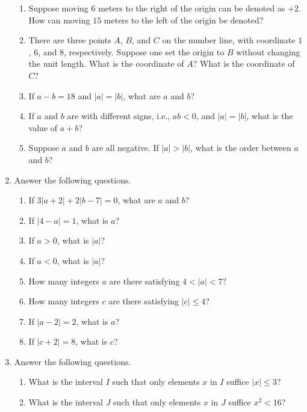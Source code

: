 \documentclass[11pt]{book}
\begin{document}
\begin{enumerate}[label=\arabic*.]
\begin{enumerate}
        \item Suppose moving $6$ meters to the right of the origin can be denoted as $+2$. How can moving $15$ meters to the left of the origin be denoted?
        \item There are three points $A$, $B$, and $C$ on the number line, with coordinate $1$, $6$, and $8$, respectively. Suppose one set the origin to $B$ without changing the unit length. What is the coordinate of $A$? What is the coordinate of $C$?
        \item If $a-b=18$ and $|a|=|b|$, what are $a$ and $b$?
        \item If $a$ and $b$ are with different signs, i.e., $ab<0$, and $|a|=|b|$, what is the value of $a+b$?
        \item Suppose $a$ and $b$ are all negative. If $|a|>|b|$, what is the order between $a$ and $b$?
    \end{enumerate}
    \item Answer the following questions.
    \begin{enumerate}
        \item If $3|a+2|+2|b-7|=0$, what are $a$ and $b$?
        \item If $|4-a|=1$, what is $a$?
        \item If $a>0$, what is $|a|$?
        \item If $a<0$, what is $|a|$?
        \item How many integers $a$ are there satisfying $4<|a|<7$?
        \item How many integers $c$ are there satisfying $|c|\leq 4$?
        \item If $|a-2|=2$, what is $a$?
        \item If $|c+2|=8$, what is $c$?
    \end{enumerate}
    \item Answer the following questions.
    \begin{enumerate}
        \item What is the interval $I$ such that only elements $x$ in $I$ suffice $|x|\leq 3$?
        \item What is the interval $J$ such that only elements $x$ in $J$ suffice $x^2<16$?
    \end{enumerate}

\end{enumerate}
\end{document}
